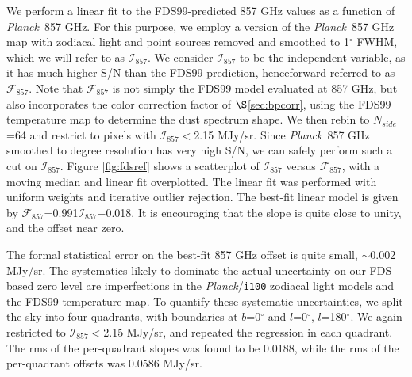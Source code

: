 \documentclass{emulateapj}
\newcommand{\PLANCK}{{\it Planck}}
\begin{document}
We perform a linear fit to the FDS99-predicted 857 GHz values as 
a function of \PLANCK~857 GHz. For this purpose, we employ a version of the 
\PLANCK~857 GHz map with zodiacal light and point sources removed and smoothed 
to 1$^{\circ}$ FWHM, which we will refer to as $\mathcal{I}_{857}$. We 
consider $\mathcal{I}_{857}$ to be the independent variable, as it has much 
higher S/N than the FDS99 prediction, henceforward referred to as 
$\mathcal{F}_{857}$. Note that $\mathcal{F}_{857}$ is not simply the FDS99
model evaluated at 857 GHz, but also incorporates the color correction factor 
of $\S$\ref{sec:bpcorr}, using the FDS99 temperature map to determine the dust 
spectrum shape. We then rebin to $N_{side}$=64 and restrict to pixels with 
$\mathcal{I}_{857}$$<$2.15 MJy/sr. Since \PLANCK~857 GHz smoothed to degree 
resolution has very high S/N, we can safely perform such a cut on 
$\mathcal{I}_{857}$. Figure \ref{fig:fdsref} shows a scatterplot of 
$\mathcal{I}_{857}$ versus $\mathcal{F}_{857}$, with a moving median and linear
fit overplotted. The linear fit was performed with uniform weights and 
iterative outlier rejection. The best-fit linear model is given by 
$\mathcal{F}_{857}$=0.991$\mathcal{I}_{857}$$-$0.018. It is encouraging that 
the slope is quite close to unity, and the offset near zero.


The formal statistical error on the best-fit 857 GHz offset is quite small, 
$\sim$0.002 MJy/sr. The systematics likely to dominate the actual uncertainty 
on our FDS-based zero level are imperfections in the \PLANCK/\verb|i100| 
zodiacal light models and the FDS99 temperature map. To quantify these 
systematic uncertainties, we split the sky into four quadrants, with boundaries
at $b$=0$^{\circ}$ and $l$=0$^{\circ}$, $l$=180$^{\circ}$. We again restricted 
to $\mathcal{I}_{857}$$<$2.15 MJy/sr, and repeated the regression in each 
quadrant. The rms of the per-quadrant slopes was found to be 0.0188, while the 
rms of the per-quadrant offsets was 0.0586 MJy/sr.


\end{document}
